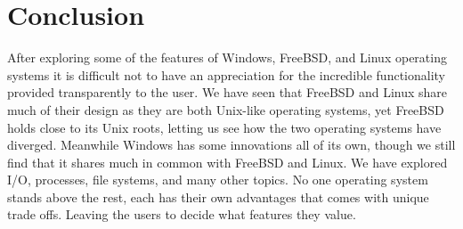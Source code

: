 \documentclass[letterpaper, 10pt, onecolumn, draftclsnofoot]{IEEEtran}
\begin{document}
\newpage

\section{Conclusion}

After exploring some of the features of Windows, FreeBSD, and Linux operating systems it is difficult not to have an appreciation for the incredible functionality provided transparently to the user. We have seen that FreeBSD and Linux share much of their design as they are both Unix-like operating systems, yet FreeBSD holds close to its Unix roots, letting us see how the two operating systems have diverged. Meanwhile Windows has some innovations all of its own, though we still find that it shares much in common with FreeBSD and Linux. We have explored I/O, processes, file systems, and many other topics. No one operating system stands above the rest, each has their own advantages that comes with unique trade offs. Leaving the users to decide what features they value.

\newpage



\end{document}
